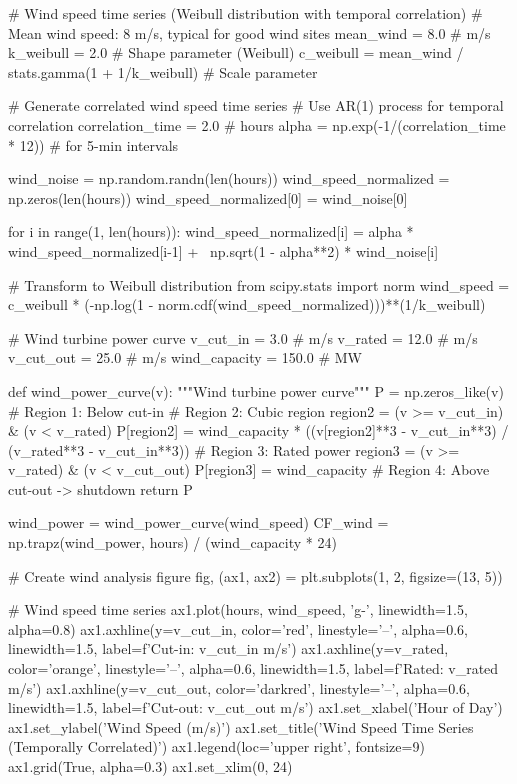 \documentclass[11pt,a4paper]{article}
\begin{document}
\begin{pycode}
# Wind speed time series (Weibull distribution with temporal correlation)
# Mean wind speed: 8 m/s, typical for good wind sites
mean_wind = 8.0  # m/s
k_weibull = 2.0  # Shape parameter (Weibull)
c_weibull = mean_wind / stats.gamma(1 + 1/k_weibull)  # Scale parameter

# Generate correlated wind speed time series
# Use AR(1) process for temporal correlation
correlation_time = 2.0  # hours
alpha = np.exp(-1/(correlation_time * 12))  # for 5-min intervals

wind_noise = np.random.randn(len(hours))
wind_speed_normalized = np.zeros(len(hours))
wind_speed_normalized[0] = wind_noise[0]

for i in range(1, len(hours)):
    wind_speed_normalized[i] = alpha * wind_speed_normalized[i-1] + \
                                np.sqrt(1 - alpha**2) * wind_noise[i]

# Transform to Weibull distribution
from scipy.stats import norm
wind_speed = c_weibull * (-np.log(1 - norm.cdf(wind_speed_normalized)))**(1/k_weibull)

# Wind turbine power curve
v_cut_in = 3.0   # m/s
v_rated = 12.0   # m/s
v_cut_out = 25.0 # m/s
wind_capacity = 150.0  # MW

def wind_power_curve(v):
    """Wind turbine power curve"""
    P = np.zeros_like(v)
    # Region 1: Below cut-in
    # Region 2: Cubic region
    region2 = (v >= v_cut_in) & (v < v_rated)
    P[region2] = wind_capacity * ((v[region2]**3 - v_cut_in**3) /
                                   (v_rated**3 - v_cut_in**3))
    # Region 3: Rated power
    region3 = (v >= v_rated) & (v < v_cut_out)
    P[region3] = wind_capacity
    # Region 4: Above cut-out -> shutdown
    return P

wind_power = wind_power_curve(wind_speed)
CF_wind = np.trapz(wind_power, hours) / (wind_capacity * 24)

# Create wind analysis figure
fig, (ax1, ax2) = plt.subplots(1, 2, figsize=(13, 5))

# Wind speed time series
ax1.plot(hours, wind_speed, 'g-', linewidth=1.5, alpha=0.8)
ax1.axhline(y=v_cut_in, color='red', linestyle='--', alpha=0.6, linewidth=1.5,
            label=f'Cut-in: {v_cut_in} m/s')
ax1.axhline(y=v_rated, color='orange', linestyle='--', alpha=0.6, linewidth=1.5,
            label=f'Rated: {v_rated} m/s')
ax1.axhline(y=v_cut_out, color='darkred', linestyle='--', alpha=0.6, linewidth=1.5,
            label=f'Cut-out: {v_cut_out} m/s')
ax1.set_xlabel('Hour of Day')
ax1.set_ylabel('Wind Speed (m/s)')
ax1.set_title('Wind Speed Time Series (Temporally Correlated)')
ax1.legend(loc='upper right', fontsize=9)
ax1.grid(True, alpha=0.3)
ax1.set_xlim(0, 24)


\end{pycode}
\end{document}
